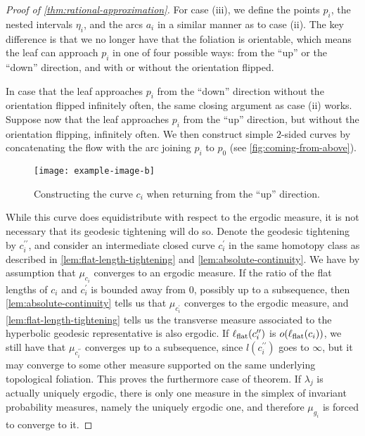 \documentclass[12pt, reqno]{amsart}
\begin{document}
\begin{proof}[Proof of \autoref{thm:rational-approximation}]
  For case (iii), we define the points $p_i$, the nested intervals $\eta_i$, and the arcs $a_i$ in a similar manner as to case (ii).
  The key difference is that we no longer have that the foliation is orientable, which means the leaf can approach $p_i$ in one of four possible ways: from the ``up'' or the ``down'' direction, and with or without the orientation flipped.

  In case that the leaf approaches $p_i$ from the ``down'' direction without the orientation flipped infinitely often, the same closing argument as case (ii) works.
  Suppose now that the leaf approaches $p_i$ from the ``up'' direction, but without the orientation flipping, infinitely often.
  We then construct simple $2$-sided curves by concatenating the flow with the arc joining $p_i$ to $p_0$ (see \autoref{fig:coming-from-above}).
  \begin{figure}[h]
    \centering
    \texttt{[image: example-image-b]}
    \caption{Constructing the curve $c_i$ when returning from the ``up'' direction.}
    \label{fig:coming-from-above}
  \end{figure}
  While this curve does equidistribute with respect to the ergodic measure, it is not necessary that its geodesic tightening will do so.
  Denote the geodesic tightening by $c_i^{\prime \prime}$, and consider an intermediate closed curve $c_i^{\prime}$ in the same homotopy class as described in \autoref{lem:flat-length-tightening} and \autoref{lem:absolute-continuity}.
  We have by assumption that $\mu_{c_i}$ converges to an ergodic measure.
  If the ratio of the flat lengths of $c_i$ and $c_i^{\prime}$ is bounded away from $0$, possibly up to a subsequence, then \autoref{lem:absolute-continuity} tells us that $\mu_{c_i^{\prime}}$ converges to the ergodic measure, and \autoref{lem:flat-length-tightening} tells us the transverse measure associated to the hyperbolic geodesic representative is also ergodic.
  If $\ell_{\mathrm{flat}}(c_i^{\prime \prime})$ is $o(\ell_{\mathrm{flat}}(c_i))$, we still have that $\mu_{c_i^{\prime \prime}}$ converges up to a subsequence, since $l(c_i^{\prime \prime})$ goes to $\infty$, but it may converge to some other measure supported on the same underlying topological foliation.
  This proves the furthermore case of theorem.
  If $\lambda_j$ is actually uniquely ergodic, there is only one measure in the simplex of invariant probability measures, namely the uniquely ergodic one, and therefore $\mu_{g_i}$ is forced to converge to it.


\end{proof}
\end{document}
